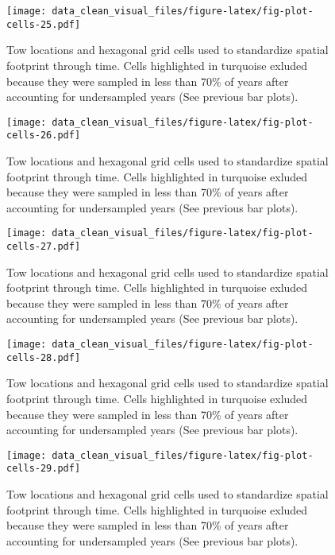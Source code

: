 \documentclass[
]{article}
\begin{document}
\begin{figure}
\centering
\texttt{[image: data\_clean\_visual\_files/figure-latex/fig-plot-cells-25.pdf]}
\caption{\label{fig:fig-plot-cells-25}Tow locations and hexagonal grid cells used to standardize spatial footprint through time. Cells highlighted in turquoise exluded because they were sampled in less than 70\% of years after accounting for undersampled years (See previous bar plots).}
\end{figure}

\begin{figure}
\centering
\texttt{[image: data\_clean\_visual\_files/figure-latex/fig-plot-cells-26.pdf]}
\caption{\label{fig:fig-plot-cells-26}Tow locations and hexagonal grid cells used to standardize spatial footprint through time. Cells highlighted in turquoise exluded because they were sampled in less than 70\% of years after accounting for undersampled years (See previous bar plots).}
\end{figure}

\begin{figure}
\centering
\texttt{[image: data\_clean\_visual\_files/figure-latex/fig-plot-cells-27.pdf]}
\caption{\label{fig:fig-plot-cells-27}Tow locations and hexagonal grid cells used to standardize spatial footprint through time. Cells highlighted in turquoise exluded because they were sampled in less than 70\% of years after accounting for undersampled years (See previous bar plots).}
\end{figure}

\begin{figure}
\centering
\texttt{[image: data\_clean\_visual\_files/figure-latex/fig-plot-cells-28.pdf]}
\caption{\label{fig:fig-plot-cells-28}Tow locations and hexagonal grid cells used to standardize spatial footprint through time. Cells highlighted in turquoise exluded because they were sampled in less than 70\% of years after accounting for undersampled years (See previous bar plots).}
\end{figure}

\begin{figure}
\centering
\texttt{[image: data\_clean\_visual\_files/figure-latex/fig-plot-cells-29.pdf]}
\caption{\label{fig:fig-plot-cells-29}Tow locations and hexagonal grid cells used to standardize spatial footprint through time. Cells highlighted in turquoise exluded because they were sampled in less than 70\% of years after accounting for undersampled years (See previous bar plots).}
\end{figure}
\end{document}
